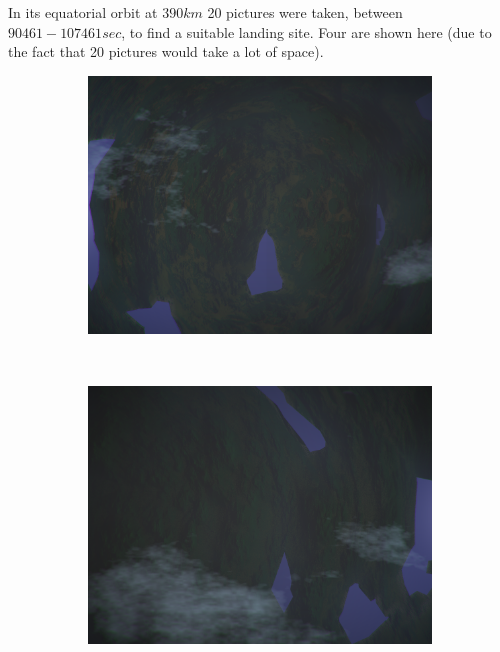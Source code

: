 \documentclass[a4paper, 10pt]{article}
\begin{document}
In its equatorial orbit at $390 km$ 20 pictures were taken, between $ 90461-107461 sec$, to find a suitable landing site. Four are shown here (due to the fact that 20 pictures would take a lot of space).

\begin{figure}[H]
\centering
\begin{subfigure}[t]{0.5\textwidth}
\centering
\includegraphics[width=\textwidth]{Image0005.png}
\end{subfigure}%
~
\begin{subfigure}[t]{0.5\textwidth}
\centering
\includegraphics[width=\textwidth]{Image0006.png}
\end{subfigure}%
\quad
\begin{subfigure}[t]{0.5\textwidth}

\end{subfigure}
\end{figure}
\end{document}

